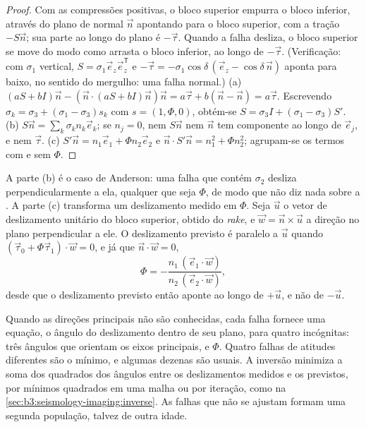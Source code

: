 \begin{proof}
Com as compressões positivas, o bloco superior empurra o bloco inferior, através
do plano de normal $\vec n$ apontando para o bloco superior, com a
tração $-S\vec n$; sua parte ao longo do plano é $-\vec\tau$. Quando a
falha desliza, o bloco superior se move do modo como arrasta o bloco inferior, ao longo de
$-\vec\tau$. (Verificação: com $\sigma_1$ vertical, $S = \sigma_1\vec e_z\vec
e_z^{\mathsf T}$ e $-\vec\tau = -\sigma_1\cos\delta\,(\vec e_z -
\cos\delta\,\vec n)$ aponta para baixo, no sentido do mergulho: uma falha normal.)
(a) $(aS + bI)\vec n - (\vec n\cdot(aS + bI)\vec n)\vec n = a\vec\tau + b(\vec
n - \vec n) = a\vec\tau$. Escrevendo $\sigma_k = \sigma_3 + (\sigma_1 -
\sigma_3)s_k$ com $s = (1, \Phi, 0)$, obtém-se $S = \sigma_3 I + (\sigma_1 -
\sigma_3)S'$.
(b) $S\vec n = \sum_k\sigma_kn_k\vec e_k$; se $n_j = 0$, nem $S\vec n$
nem $\vec n$ tem componente ao longo de $\vec e_j$, e nem $\vec\tau$.
(c) $S'\vec n = n_1\vec e_1 + \Phi n_2\vec e_2$ e $\vec n\cdot S'\vec n =
n_1^2 + \Phi n_2^2$; agrupam-se os termos com e sem $\Phi$.
\end{proof}

A parte (b) é o caso de Anderson: uma falha que contém $\sigma_2$ desliza
perpendicularmente a ela, qualquer que seja $\Phi$, de modo que não diz nada sobre a
. A parte (c) transforma um deslizamento medido em $\Phi$. Seja $\vec u$ o
vetor de deslizamento unitário do bloco superior, obtido do \textit{rake}, e $\vec w = \vec n\times\vec
u$ a direção no plano perpendicular a ele. O deslizamento previsto é
paralelo a $\vec u$ quando $(\vec\tau_0 + \Phi\vec\tau_1)\cdot\vec w = 0$, e
já que $\vec n\cdot\vec w = 0$,
\[
  \Phi = -\frac{n_1\,(\vec e_1\cdot\vec w)}{n_2\,(\vec e_2\cdot\vec w)} ,
\]
desde que o deslizamento previsto então aponte ao longo de $+\vec u$, e não de $-\vec u$.

Quando as direções principais não são conhecidas, cada falha fornece uma equação,
o ângulo do deslizamento dentro de seu plano, para quatro incógnitas: três ângulos que
orientam os eixos principais, e $\Phi$. Quatro falhas de atitudes diferentes são
o mínimo, e algumas dezenas são usuais. A inversão minimiza a soma dos
quadrados dos ângulos entre os deslizamentos medidos e os previstos, por mínimos quadrados
em uma malha ou por iteração, como na \cref{sec:b3:seismology-imaging:inverse}.
As falhas que não se ajustam formam uma segunda população, talvez de outra idade.

